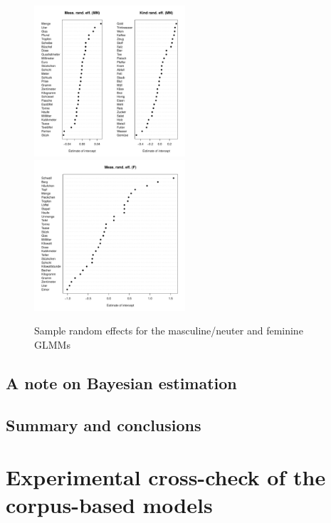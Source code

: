 \documentclass[USenglish]{article}
\begin{document}
\begin{figure}[h]
\centering
\includegraphics[width=0.5\textwidth]{figures/corpus/04_glmm_raneff_mn}~\hspace{0.05\textwidth}~\includegraphics[width=0.5\textwidth]{figures/corpus/04_glmm_raneff_fem}
\caption{Sample random effects for the masculine\slash neuter and feminine GLMMs}
\label{fig:glmm:fixef:minus1pos}
\end{figure}




\subsection{A note on Bayesian estimation}
\label{ssec:bayesian}



\subsection{Summary and conclusions}
\label{ssec:modelssummary}





\section{Experimental cross-check of the corpus-based models}
\label{sec:externalvalidation}
\end{document}

